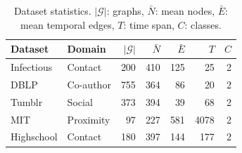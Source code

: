 \begin{table}[t]
\centering
\caption{Dataset statistics. $|\mathcal{G}|$: graphs, $\bar{N}$: mean nodes, $\bar{E}$: mean temporal edges, $T$: time span, $C$: classes.}
\label{tab:datasets}
\small
\setlength{\tabcolsep}{5pt}
\begin{tabular}{llrrrrr}
\toprule
\textbf{Dataset} & \textbf{Domain} & $|\mathcal{G}|$ & $\bar{N}$ & $\bar{E}$ & $T$ & $C$ \\
\midrule
Infectious & Contact & 200 & 410 & 125 & 25 & 2 \\
DBLP & Co-author & 755 & 364 & 86 & 20 & 2 \\
Tumblr & Social & 373 & 394 & 39 & 68 & 2 \\
MIT & Proximity & 97 & 227 & 581 & 4078 & 2 \\
Highschool & Contact & 180 & 397 & 144 & 177 & 2 \\
\bottomrule
\end{tabular}
\end{table}